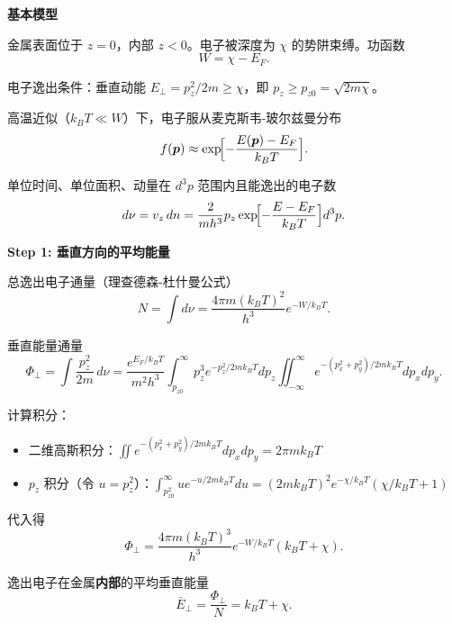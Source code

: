 \begin{derivationbox}[标准解题过程]
\textbf{基本模型}

金属表面位于 $z=0$，内部 $z<0$。电子被深度为 $\chi$ 的势阱束缚。功函数
\begin{equation}
W=\chi-E_F.
\end{equation}

电子逸出条件：垂直动能 $E_\perp=p_z^2/2m\ge\chi$，即 $p_z\ge p_{z0}=\sqrt{2m\chi}$。

高温近似（$k_BT\ll W$）下，电子服从麦克斯韦-玻尔兹曼分布
\begin{equation}
f(\bm{p})\approx\exp\!\Bigl[-\frac{E(\bm{p})-E_F}{k_BT}\Bigr].
\end{equation}

单位时间、单位面积、动量在 $d^3p$ 范围内且能逸出的电子数
\begin{equation}
d\nu=v_z\,dn=\frac{2}{mh^3}p_z\exp\!\Bigl[-\frac{E-E_F}{k_BT}\Bigr]d^3p.
\end{equation}

\textbf{Step 1: 垂直方向的平均能量}

总逸出电子通量（理查德森-杜什曼公式）
\begin{equation}
N=\int d\nu=\frac{4\pi m(k_BT)^2}{h^3}e^{-W/k_BT}.
\end{equation}

垂直能量通量
\begin{equation}
\Phi_\perp=\int\frac{p_z^2}{2m}\,d\nu
=\frac{e^{E_F/k_BT}}{m^2h^3}\int_{p_{z0}}^\infty p_z^3e^{-p_z^2/2mk_BT}dp_z
\iint_{-\infty}^\infty e^{-(p_x^2+p_y^2)/2mk_BT}dp_xdp_y.
\end{equation}

计算积分：
\begin{itemize}
    \item 二维高斯积分：$\iint e^{-(p_x^2+p_y^2)/2mk_BT}dp_xdp_y=2\pi mk_BT$
    \item $p_z$ 积分（令 $u=p_z^2$）：$\int_{p_{z0}^2}^\infty ue^{-u/2mk_BT}du=(2mk_BT)^2e^{-\chi/k_BT}(\chi/k_BT+1)$
\end{itemize}

代入得
\begin{equation}
\Phi_\perp=\frac{4\pi m(k_BT)^3}{h^3}e^{-W/k_BT}(k_BT+\chi).
\end{equation}

逸出电子在金属\textbf{内部}的平均垂直能量
\begin{equation}
\bar E_\perp=\frac{\Phi_\perp}{N}=k_BT+\chi.
\end{equation}


\end{derivationbox}
